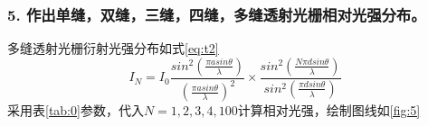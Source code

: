 \documentclass[12pt,a4paper,UTF8]{ctexart}
\begin{document}
\subsubsection*{5. 作出单缝，双缝，三缝，四缝，多缝透射光栅相对光强分布。}
多缝透射光栅衍射光强分布如式\ref{eq:t2}
\begin{equation}\label{eq:t2}
	I_N = I_0\frac{sin^2(\frac{\pi asin \theta}{\lambda})}{(\frac{\pi asin \theta}{\lambda})^2} \times \frac{sin^2(\frac{N\pi dsin \theta}{\lambda})}{sin^2(\frac{\pi dsin \theta}{\lambda})}
\end{equation}
采用表\ref{tab:0}参数，代入$N = 1,2,3,4,100$计算相对光强，绘制图线如\ref{fig:5}
\newpage
\begin{figure}[htbp]
	\centering



\end{figure}
\end{document}
